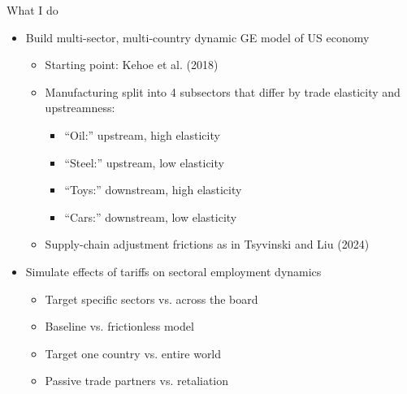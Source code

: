 \documentclass[aspectratio=169,t,10pt,table]{beamer}
\begin{document}
\begin{frame}{What I do}

\begin{itemize}\addtolength{\itemsep}{1ex}
    \item Build multi-sector, multi-country dynamic GE model of US economy
    \begin{itemize}\addtolength{\itemsep}{0.5ex}
        \item Starting point: Kehoe et al. (2018)
        \item Manufacturing split into 4 subsectors that differ by trade elasticity and upstreamness:
        \begin{itemize}\addtolength{\itemsep}{0.3ex}
            \item ``Oil:'' upstream, high elasticity
            \item ``Steel:'' upstream, low elasticity
            \item ``Toys:'' downstream, high elasticity
            \item ``Cars:'' downstream, low elasticity
        \end{itemize}
        \item Supply-chain adjustment frictions as in Tsyvinski and Liu (2024)
    \end{itemize}
   \item Simulate effects of tariffs on sectoral employment dynamics
   \begin{itemize}
       \item Target specific sectors vs. across the board
        \item Baseline vs. frictionless model
       \item Target one country vs. entire world
       \item Passive trade partners vs. retaliation
   \end{itemize}
\end{itemize}

\end{frame}
\end{document}
